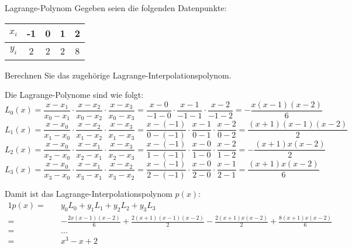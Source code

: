 \begin{example}{Lagrange-Polynom}
    Gegeben seien die folgenden Datenpunkte: 
    
    \begin{center}
        \begin{tabular}{|c||c|c|c|c|}
            \hline
            $x_i$ & -1 & 0 & 1 & 2 \\ 
            \hline
            $y_i$ & 2  & 2 & 2 & 8 \\
            \hline
        \end{tabular}
    \end{center}
    
    Berechnen Sie das zugehörige Lagrange-Interpolationspolynom.
    
    \exampleseparator
    
    Die Lagrange-Polynome sind wie folgt: 
    \[ 
        L_0(x) = \frac{x - x_1}{x_0 - x_1} \cdot \frac{x - x_2}{x_0 - x_2} \cdot \frac{x - x_3}{x_0 - x_3} = \frac{x - 0}{-1 - 0} \cdot \frac{x - 1}{-1 - 1} \cdot \frac{x - 2}{-1 - 2} = -\frac{x(x-1)(x-2)}{6}
    \]
    \[ 
        L_1(x) = \frac{x - x_0}{x_1 - x_0} \cdot \frac{x - x_2}{x_1 - x_2} \cdot \frac{x - x_3}{x_1 - x_3} = \frac{x - (-1)}{0 - (-1)} \cdot \frac{x - 1}{0 - 1} \cdot \frac{x - 2}{0 - 2} = \frac{(x+1)(x-1)(x-2)}{2}
    \]
    \[ 
        L_2(x) = \frac{x - x_0}{x_2 - x_0} \cdot \frac{x - x_1}{x_2 - x_1} \cdot \frac{x - x_3}{x_2 - x_3} = \frac{x - (-1)}{1 - (-1)} \cdot \frac{x - 0}{1 - 0} \cdot \frac{x - 2}{1 - 2} = -\frac{(x+1)x(x-2)}{2}
    \]
    \[ 
        L_3(x) = \frac{x - x_0}{x_3 - x_0} \cdot \frac{x - x_1}{x_3 - x_1} \cdot \frac{x - x_2}{x_3 - x_2} = \frac{x - (-1)}{2 - (-1)} \cdot \frac{x - 0}{2 - 0} \cdot \frac{x - 1}{2 - 1} = \frac{(x+1)x(x-2)}{6}
    \]
    
    Damit ist das Lagrange-Interpolationspolynom $p(x)$: 
    \begin{alignat*}{1}
        p(x) = \quad & y_0 L_0 + y_1 L_1 + y_2 L_2 + y_3 L_3                                                                  \\
        =      \quad & -\frac{2x(x-1)(x-2)}{6} + \frac{2(x+1)(x-1)(x-2)}{2} - \frac{2(x+1)x(x-2)}{2} + \frac{8(x+1)x(x-2)}{6} \\ 
        =      \quad & \ldots                                                                                                 \\ 
        =      \quad & x^3 - x + 2
    \end{alignat*}
\end{example}

